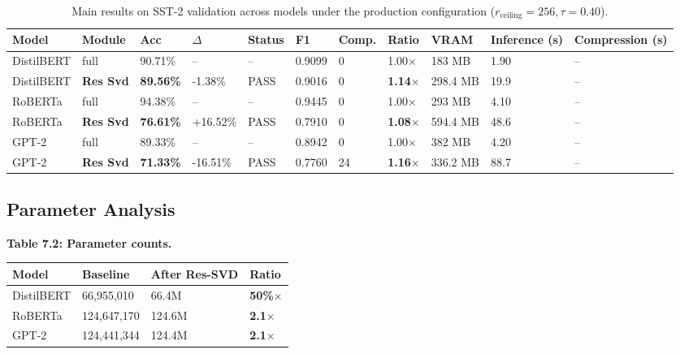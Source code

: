 \begin{table}[t]
\centering
\small
\begin{tabular}{lllllllllll}
\toprule
\textbf{Model} & \textbf{Module} & \textbf{Acc} & \textbf{$\Delta$} & \textbf{Status} & \textbf{F1} & \textbf{Comp.} & \textbf{Ratio} & \textbf{VRAM} & \textbf{Inference (s)} & \textbf{Compression (s)} \\
\midrule
DistilBERT & full & 90.71\% & -- & -- & 0.9099 & 0 & 1.00$\times$ & 183 MB & 1.90 & -- \\
DistilBERT & \textbf{Res Svd} & \textbf{89.56\%} & -1.38\% & PASS & 0.9016 & 0 & \textbf{1.14$\times$} & 298.4 MB & 19.9 & -- \\
RoBERTa & full & 94.38\% & -- & -- & 0.9445 & 0 & 1.00$\times$ & 293 MB & 4.10 & -- \\
RoBERTa & \textbf{Res Svd} & \textbf{76.61\%} & +16.52\% & PASS & 0.7910 & 0 & \textbf{1.08$\times$} & 594.4 MB & 48.6 & -- \\
GPT-2 & full & 89.33\% & -- & -- & 0.8942 & 0 & 1.00$\times$ & 382 MB & 4.20 & -- \\
GPT-2 & \textbf{Res Svd} & \textbf{71.33\%} & -16.51\% & PASS & 0.7760 & 24 & \textbf{1.16$\times$} & 336.2 MB & 88.7 & -- \\
\bottomrule
\end{tabular}
\caption{Main results on SST-2 validation across models under the production configuration ($r_{\mathrm{ceiling}}=256, \tau=0.40$).}
\label{tab:main_sst2}
\end{table}

\subsection{Parameter Analysis}

\textbf{Table 7.2: Parameter counts.}

\begin{table}[H]
\centering
\small
\begin{tabular}{llll}
\toprule
\textbf{Model} & \textbf{Baseline} & \textbf{After Res-SVD} & \textbf{Ratio} \\
\midrule
DistilBERT & 66,955,010 & 66.4M & \textbf{50\%$\times$} \\
RoBERTa & 124,647,170 & 124.6M & \textbf{2.1$\times$} \\
GPT-2 & 124,441,344 & 124.4M & \textbf{2.1$\times$} \\
\bottomrule
\end{tabular}
\end{table}

